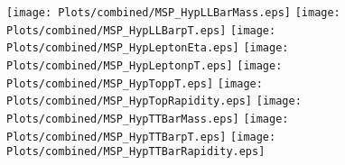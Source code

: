 \documentclass[a4paper,10pt,landscape,pagesize]{scrartcl}
\begin{document}
\newpage
\texttt{[image: Plots/combined/MSP\_HypLLBarMass.eps]}
\texttt{[image: Plots/combined/MSP\_HypLLBarpT.eps]}
\texttt{[image: Plots/combined/MSP\_HypLeptonEta.eps]}
\texttt{[image: Plots/combined/MSP\_HypLeptonpT.eps]}
\texttt{[image: Plots/combined/MSP\_HypToppT.eps]}
\texttt{[image: Plots/combined/MSP\_HypTopRapidity.eps]}
\texttt{[image: Plots/combined/MSP\_HypTTBarMass.eps]}
\texttt{[image: Plots/combined/MSP\_HypTTBarpT.eps]}
\texttt{[image: Plots/combined/MSP\_HypTTBarRapidity.eps]}
\end{document}
